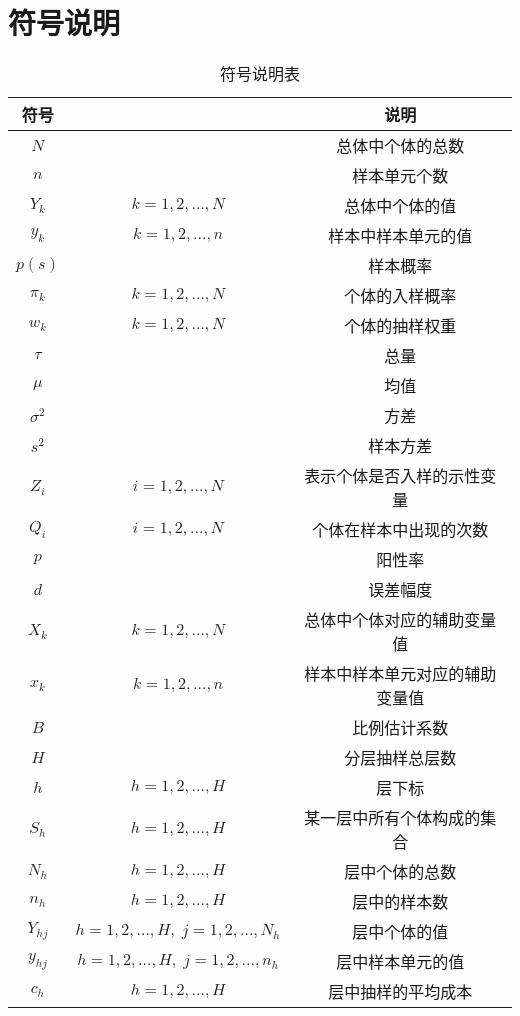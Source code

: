 
\chapter*{符号说明} %
\begin{table}[h]
	\centering
	\setlength{\tabcolsep}{25pt} %
	\begin{tabular}{ccc}
		\toprule
		符号    &  & 说明 \\
		\midrule
		$N$         &                      & 总体中个体的总数 \\
		$n$         &                      & 样本单元个数 \\
		$Y_k$		& $k=1,2,\dots,N$      & 总体中个体的值 \\
		$y_k$		& $k=1,2,\dots,n$      & 样本中样本单元的值 \\
		$p(s)$      &                      & 样本概率 \\
		$\pi_k$		& $k=1,2,\dots,N$      & 个体的入样概率 \\
		$w_k$		& $k=1,2,\dots,N$      & 个体的抽样权重 \\
		$\tau$      &                      & 总量 \\
		$\mu$       &               	   & 均值 \\
		$\sigma^2$  &                      & 方差 \\
		$s^2$       &                      & 样本方差 \\
		$Z_i$		& $i=1,2,\dots,N$      & 表示个体是否入样的示性变量 \\
		$Q_i$		& $i=1,2,\dots,N$      & 个体在样本中出现的次数 \\
		$p$         &                      & 阳性率 \\
		$d$         &                      & 误差幅度 \\
		$X_k$		& $k=1,2,\dots,N$      & 总体中个体对应的辅助变量值 \\
		$x_k$		& $k=1,2,\dots,n$      & 样本中样本单元对应的辅助变量值 \\
		$B$         &                      & 比例估计系数 \\
		$H$		    &                      & 分层抽样总层数 \\
		$h$         & $h=1,2,\dots,H$      & 层下标 \\
		$S_h$       & $h=1,2,\dots,H$      & 某一层中所有个体构成的集合 \\
		$N_h$		& $h=1,2,\dots,H$	   & 层中个体的总数 \\
		$n_h$		& $h=1,2,\dots,H$	   & 层中的样本数 \\
		$Y_{hj}$    & $h=1,2,\dots,H,\;j=1,2,\dots,N_h$ & 层中个体的值 \\
		$y_{hj}$    & $h=1,2,\dots,H,\;j=1,2,\dots,n_h$ & 层中样本单元的值 \\
		$c_h$       & $h=1,2,\dots,H$      & 层中抽样的平均成本 \\
		\bottomrule
	\end{tabular}
	\caption{符号说明表}
\end{table}
